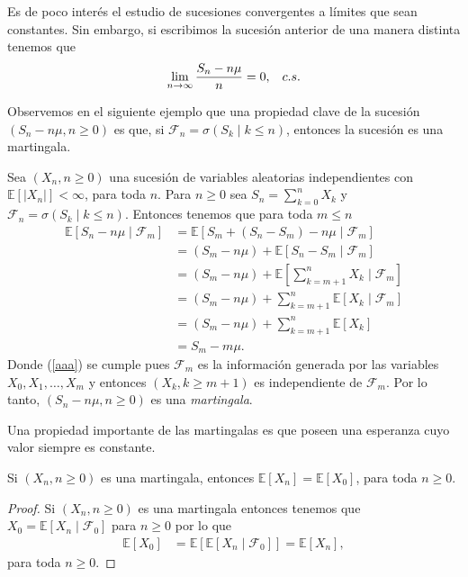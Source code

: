 Es de poco interés el estudio de sucesiones convergentes a límites que sean constantes. Sin embargo, si escribimos la sucesión anterior de una manera distinta tenemos que
\begin{align*}
	\lim_{n \rightarrow \infty} \frac{S_n - n\mu}{n} = 0, \hspace{0.3cm} c.s.
\end{align*}

Observemos en el siguiente ejemplo que una propiedad clave de la sucesión $(S_n - n\mu, n \geq 0)$ es que, si $\mathcal{F}_n = \sigma ( S_k \mid k \leq n )$, entonces la sucesión es una martingala.

\begin{example}
	Sea $(X_n, n \geq 0)$ una sucesión de variables aleatorias independientes con $\mathbb{E}[|X_n|] < \infty$, para toda $n$. Para $n \geq 0$ sea $S_n = \sum_{k=0}^n X_k$ y $\mathcal{F}_n = \sigma ( S_k \mid k \leq n )$. Entonces tenemos que para toda $m \leq n$
	\begin{align}
		\mathbb{E}[S_n - n\mu \mid \mathcal{F}_m] & = \mathbb{E}[S_m + (S_n - S_m) - n\mu \mid \mathcal{F}_m] \nonumber \\
		& = (S_m - n\mu) + \mathbb{E}[S_n - S_m \mid \mathcal{F}_m] \nonumber \\
		& = (S_m - n\mu) + \mathbb{E}\left[\sum_{k = m+1}^{n} X_k \mid \mathcal{F}_m\right] \nonumber \\
		& = (S_m - n\mu) + \sum_{k = m+1}^{n} \mathbb{E}[X_k \mid \mathcal{F}_m] \nonumber \\
		& = (S_m - n\mu) + \sum_{k = m+1}^{n} \mathbb{E}[X_k]  \label{aaa} \\
		& = S_m - m\mu. \nonumber
	\end{align}
	Donde (\ref{aaa}) se cumple pues $\mathcal{F}_m$ es la información generada por las variables $X_0, X_1, \ldots, X_m$ y entonces $(X_k, k \geq m+1)$ es independiente de $\mathcal{F}_m$. Por lo tanto, $(S_n - n\mu, n \geq 0)$ es una \emph{martingala}.
\end{example}

Una propiedad importante de las martingalas es que poseen una esperanza cuyo valor siempre es constante.
\begin{proposition} \label{martin}
	Si $(X_n, n \geq 0)$ es una martingala, entonces $\mathbb{E}[X_n] = \mathbb{E}[X_0]$, para toda $n \geq 0$.
\end{proposition}
\begin{proof}
	Si $(X_n, n \geq 0)$ es una martingala entonces tenemos que $X_0 = \mathbb{E}[X_n \mid \mathcal{F}_0]$ para $n \geq 0$ por lo que
	\begin{align*}
		\mathbb{E}[X_0] & = \mathbb{E}[\mathbb{E}[X_n \mid \mathcal{F}_0]] = \mathbb{E}[X_n],
	\end{align*}
para toda $n \geq 0$.
\end{proof}

